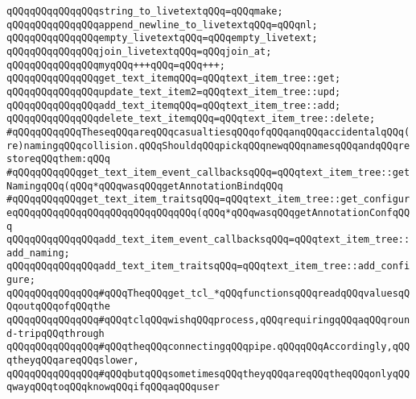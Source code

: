 \newline
\verb|qQQqqQQqqQQqqQQqstring_to_livetextqQQq=qQQqmake;|\newline
\verb|qQQqqQQqqQQqqQQqappend_newline_to_livetextqQQq=qQQqnl;|\newline
\verb|qQQqqQQqqQQqqQQqempty_livetextqQQq=qQQqempty_livetext;|\newline
\verb|qQQqqQQqqQQqqQQqjoin_livetextqQQq=qQQqjoin_at;|\newline
\verb|qQQqqQQqqQQqqQQqmyqQQq+++qQQq=qQQq+++;|\newline
\newline
\verb|qQQqqQQqqQQqqQQqget_text_itemqQQq=qQQqtext_item_tree::get;|\newline
\verb|qQQqqQQqqQQqqQQqupdate_text_item2=qQQqtext_item_tree::upd;|\newline
\verb|qQQqqQQqqQQqqQQqadd_text_itemqQQq=qQQqtext_item_tree::add;|\newline
\verb|qQQqqQQqqQQqqQQqdelete_text_itemqQQq=qQQqtext_item_tree::delete;|\newline
\newline
\verb|#qQQqqQQqqQQqTheseqQQqareqQQqcasualtiesqQQqofqQQqanqQQqaccidentalqQQq(re)namingqQQqcollision.qQQqShouldqQQqpickqQQqnewqQQqnamesqQQqandqQQqrestoreqQQqthem:qQQq|\newline
\verb|#qQQqqQQqqQQqget_text_item_event_callbacksqQQq=qQQqtext_item_tree::getNamingqQQq(qQQq*qQQqwasqQQqgetAnnotationBindqQQq|\newline
\verb|#qQQqqQQqqQQqget_text_item_traitsqQQq=qQQqtext_item_tree::get_configureqQQqqQQqqQQqqQQqqQQqqQQqqQQqqQQq(qQQq*qQQqwasqQQqgetAnnotationConfqQQq|\newline
\verb|qQQqqQQqqQQqqQQqadd_text_item_event_callbacksqQQq=qQQqtext_item_tree::add_naming;|\newline
\verb|qQQqqQQqqQQqqQQqadd_text_item_traitsqQQq=qQQqtext_item_tree::add_configure;|\newline
\newline
\verb|qQQqqQQqqQQqqQQq#qQQqTheqQQqget_tcl_*qQQqfunctionsqQQqreadqQQqvaluesqQQqoutqQQqofqQQqthe|\newline
\verb|qQQqqQQqqQQqqQQq#qQQqtclqQQqwishqQQqprocess,qQQqrequiringqQQqaqQQqround-tripqQQqthrough|\newline
\verb|qQQqqQQqqQQqqQQq#qQQqtheqQQqconnectingqQQqpipe.qQQqqQQqAccordingly,qQQqtheyqQQqareqQQqslower,|\newline
\verb|qQQqqQQqqQQqqQQq#qQQqbutqQQqsometimesqQQqtheyqQQqareqQQqtheqQQqonlyqQQqwayqQQqtoqQQqknowqQQqifqQQqaqQQquser|\newline

